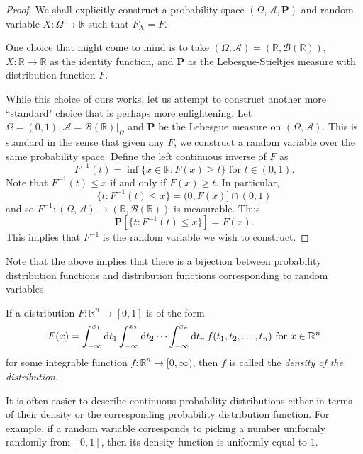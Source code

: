 \begin{proof}
    We shall explicitly construct a probability space $(\Omega,\mathcal{A},\textbf{P})$ and random variable $X:\Omega\to\mathbb{R}$ such that $F_X=F$.
    
    \vspace{1mm}
    One choice that might come to mind is to take $(\Omega,\mathcal{A}) = (\mathbb{R},\mathcal{B}(\mathbb{R}))$, $X:\mathbb{R}\to\mathbb{R}$ as the identity function, and $\textbf{P}$ as the Lebesgue-Stieltjes measure with distribution function $F$.
    
    \vspace{1.5mm}
    While this choice of ours works, let us attempt to construct another more ``standard" choice that is perhaps more enlightening. Let $\Omega=(0,1),\mathcal{A}=\left.\mathcal{B}(\mathbb{R})\right|_\Omega$ and $\textbf{P}$ be the Lebesgue measure on $(\Omega,\mathcal{A})$. This is standard in the sense that given any $F$, we construct a random variable over the same probability space. Define the left continuous inverse of $F$ as
    $$F^{-1}(t)=\inf\{x\in\mathbb{R}:F(x)\geq t\}\text{ for }t\in (0,1).$$
    Note that $F^{-1}(t)\leq x$ if and only if $F(x)\geq t$.
    In particular,
    $$\{t:F^{-1}(t)\leq x\}=(0,F(x)]\cap(0,1)$$
    and so $F^{-1}:(\Omega,\mathcal{A})\to(\mathbb{R},\mathcal{B}(\mathbb{R}))$ is measurable. Thus
    $$\textbf{P}\left[\{t:F^{-1}(t)\leq x\}\right]=F(x).$$
    This implies that $F^{-1}$ is the random variable we wish to construct.
\end{proof}

Note that the above implies that there is a bijection between probability distribution functions and distribution functions corresponding to random variables.

\begin{definition}
    If a distribution $F:\mathbb{R}^n\to[0,1]$ is of the form
    $$F(x)=\int_{-\infty}^{x_1}\operatorname{d}\!{t_1}\int_{-\infty}^{x_2}\operatorname{d}\!{t_2}\cdots\int_{-\infty}^{x_n}\operatorname{d}\!{t_n}\, f(t_1,t_2,\ldots,t_n)\text{ for }x\in\mathbb{R}^n$$
    for some integrable function $f:\mathbb{R}^n\to[0,\infty)$, then $f$ is called the \textit{density of the distribution}.
\end{definition}

It is often easier to describe continuous probability distributions either in terms of their density or the corresponding probability distribution function. For example, if a random variable corresponds to picking a number uniformly randomly from $[0,1]$, then its density function is uniformly equal to $1$.

